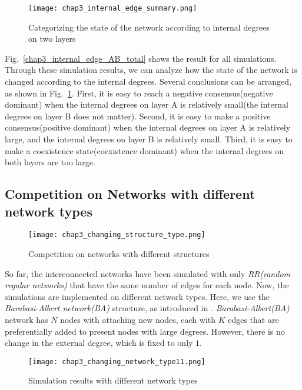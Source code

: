 \begin{figure}[!htb]
	\centering
	\texttt{[image: chap3\_internal\_edge\_summary.png]}
	\caption{Categorizing the state of the network according to internal degrees on two layers}
	\label{chap3_internal_edge_summary}
\end{figure}

Fig.~\ref{chap3_internal_edge_AB_total} shows the result for all simulations. Through these simulation results, we can analyze how the state of the network is changed according to the internal degrees. Several conclusions can be arranged, as shown in Fig.~\ref{chap3_internal_edge_summary}.  First, it is easy to reach a negative consensus(negative dominant) when the internal degrees on layer A is relatively small(the internal degrees on layer B does not matter). Second, it is easy to make a positive consensus(positive dominant) when the internal degrees on layer A is relatively large, and the internal degrees on layer B is relatively small. Third, it is easy to make a coexistence state(coexistence dominant) when the internal degrees on both layers are too large. \\ 


\subsection{Competition on Networks with different network types}

\begin{figure}[!htb]
	\centering
	\texttt{[image: chap3\_changing\_structure\_type.png]}
	\caption{Competition on networks with different structures}
	\label{chap3_changing_structure_type}
\end{figure}

So far, the interconnected networks have been simulated with only \textit{RR(random regular networks)} that have the same number of edges for each node. Now, the simulations are implemented on different network types. Here, we use the \textit{Barabasi-Albert network(BA)} structure, as introduced in \parencite{barabasi2011}. \textit{Barabasi-Albert(BA)} network has $N$ nodes with attaching new nodes, each with $K$ edges that are preferentially added to present nodes with large degrees. However, there is no change in the external degree, which is fixed to only $1$.

\begin{figure}[!htb]
	\centering
	\texttt{[image: chap3\_changing\_network\_type11.png]}
	\caption{Simulation results with different network types}
	\label{chap3_changing_network_type1}
\end{figure}

